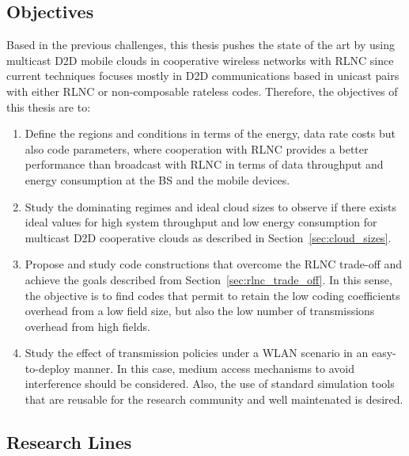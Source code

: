 \subsection{Objectives}
Based in the previous challenges, this thesis pushes the state of the art by using multicast \ac{D2D} mobile clouds in cooperative wireless networks with \ac{RLNC} since current techniques focuses mostly in \ac{D2D} communications based in unicast pairs with either \ac{RLNC} or non-composable rateless codes. Therefore, the objectives of this thesis are to:

\begin{enumerate}

\item Define the regions and conditions in terms of the energy, data rate costs but also code parameters, where cooperation with \ac{RLNC} provides a better performance than broadcast with \ac{RLNC} in terms of data throughput and energy consumption at the \ac{BS} and the mobile devices.

\item Study the dominating regimes and ideal cloud sizes to observe if there exists ideal values for high system throughput and low energy consumption for multicast \ac{D2D} cooperative clouds as described in Section~\ref{sec:cloud_sizes}.

\item Propose and study code constructions that overcome the \ac{RLNC} trade-off and achieve the goals described from Section~\ref{sec:rlnc_trade_off}. In this sense, the objective is to find codes that permit to retain the low coding coefficients overhead from a low field size, but also the low number of transmissions overhead from high fields.

\item Study the effect of transmission policies under a \ac{WLAN} scenario in an easy-to-deploy manner. In this case, medium access mechanisms to avoid interference should be considered. Also, the use of standard simulation tools that are reusable for the research community and well maintenated is desired.

\end{enumerate}

\subsection{Research Lines}

